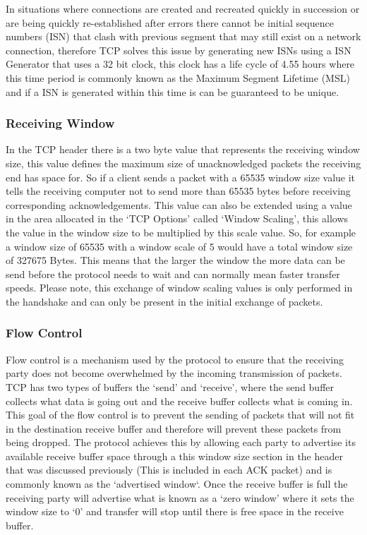 In situations where connections are created and recreated quickly in succession or are being quickly re-established after errors there cannot be initial sequence numbers (ISN) that clash with previous segment that may still exist on a network connection, therefore TCP solves this issue by generating new ISNs using a ISN Generator that uses a 32 bit clock, this clock has a life cycle of 4.55 hours where this time period is commonly known as the Maximum Segment Lifetime (MSL) and if a ISN is generated within this time is can be guaranteed to be unique.

\subsubsection*{Receiving Window}
In the TCP header there is a two byte value that represents the receiving window size, this value defines the maximum size of unacknowledged packets the receiving end has space for. So if a client sends a packet with a 65535 window size value it tells the receiving computer not to send more than 65535 bytes before receiving corresponding acknowledgements. This value can also be extended using a value in the area allocated in the `TCP Options' called `Window Scaling', this allows the value in the window size to be multiplied by this scale value. So, for example a window size of 65535 with a window scale of 5 would have a total window size of 327675 Bytes. This means that the larger the window the more data can be send before the protocol needs to wait and can normally mean faster transfer speeds. Please note, this exchange of window scaling values is only performed in the handshake and can only be present in the initial exchange of packets.

\subsubsection*{Flow Control}
Flow control is a mechanism used by the protocol to ensure that the receiving party does not become overwhelmed by the incoming transmission of packets. TCP has two types of buffers the `send' and `receive', where the send buffer collects what data is going out and the receive buffer collects what is coming in. This goal of the flow control is to prevent the sending of packets that will not fit in the destination receive buffer and therefore will prevent these packets from being dropped. The protocol achieves this by allowing each party to advertise its available receive buffer space through a this window size section in the header that was discussed previously (This is included in each ACK packet) and is commonly known as the `advertised window`. Once the receive buffer is full the receiving party will advertise what is known as a `zero window' where it sets the window size to `0' and transfer will stop until there is free space in the receive buffer.

